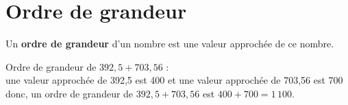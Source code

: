 \section{Ordre de grandeur}

\begin{definition}
   Un {\bf ordre de grandeur} d'un nombre est une valeur approchée de ce nombre.
\end{definition}

\begin{exemple*1}
   Ordre de grandeur de $392,5+703,56$ : \\
   une valeur approchée de 392,5 est 400 et une valeur approchée de 703,56 est 700 donc, un ordre de grandeur de $392,5+703,56$ est $400+700 =1\,100$.
\end{exemple*1}
